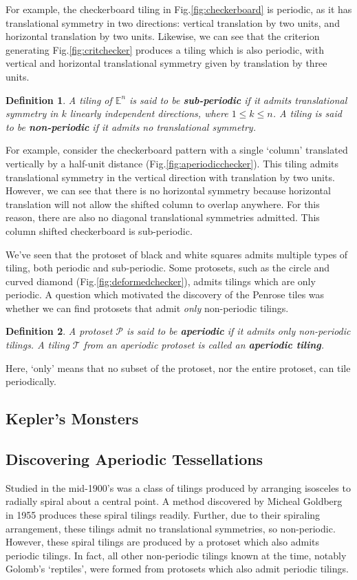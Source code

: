 \documentclass[]{article}
\newtheorem{mydef}{Definition}
\begin{document}
For example, the checkerboard tiling in Fig.\ref{fig:checkerboard} is periodic, as it has translational symmetry in two directions: vertical translation by two units, and horizontal translation by two units. Likewise, we can see that the criterion generating Fig.\ref{fig:critchecker} produces a tiling which is also periodic, with vertical and horizontal translational symmetry given by translation by three units. 

\begin{mydef}
A tiling of  $\mathbb{E}^n$ is said to be \textbf{sub-periodic} if it admits translational symmetry in $k$ linearly independent directions, where $1\leq k\leq n$. A tiling is said to be \textbf{non-periodic} if it admits no translational symmetry. 
\end{mydef}

For example, consider the checkerboard pattern with a single `column' translated vertically by a half-unit distance (Fig.\ref{fig:aperiodicchecker}). This tiling admits translational symmetry in the vertical direction with translation by two units. However, we can see that there is no horizontal symmetry because horizontal translation will not allow the shifted column to overlap anywhere. For this reason, there are also no diagonal translational symmetries admitted. This column shifted checkerboard is sub-periodic. 

We've seen that the protoset of black and white squares admits multiple types of tiling, both periodic and sub-periodic. Some protosets, such as the circle and curved diamond (Fig.\ref{fig:deformedchecker}), admits tilings which are only periodic. A question which motivated the discovery of the Penrose tiles was whether we can find protosets that admit \textit{only} non-periodic tilings.

\begin{mydef}
A protoset $\mathcal{P}$ is said to be \textbf{aperiodic} if it admits only non-periodic tilings. A tiling $\mathcal{T}$ from an aperiodic protoset is called an \textbf{aperiodic tiling}. 
\end{mydef}

Here, `only' means that no subset of the protoset, nor the entire protoset, can tile periodically. 


\subsection{Kepler's Monsters}


\subsection{Discovering Aperiodic Tessellations}
Studied in the mid-1900's was a class of tilings produced by arranging isosceles to radially spiral about a central point. A method discovered by Micheal Goldberg in 1955 produces these spiral tilings readily. Further, due to their spiraling arrangement, these tilings admit no translational symmetries, so non-periodic. However, these spiral tilings are produced by a protoset which also admits periodic tilings. In fact, all other non-periodic tilings known at the time, notably Golomb's `reptiles', were formed from protosets which also admit periodic tilings.
\end{document}
